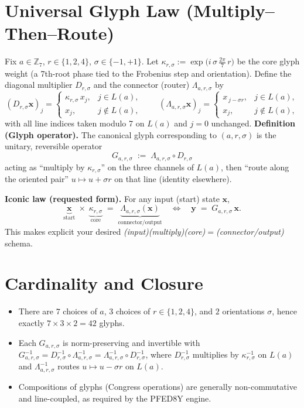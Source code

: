 \documentclass[pdflatex,sn-mathphys-num]{sn-jnl}
\theoremstyle{thmstyleone}
\theoremstyle{thmstyletwo}
\theoremstyle{thmstylethree}
\begin{document}
\section{Universal Glyph Law (Multiply–Then–Route)}\label{sec:universal-glyph-law}

Fix \(a\in\mathbb{Z}_7\), \(r\in\{1,2,4\}\), \(\sigma\in\{-1,+1\}\).
Let \(\kappa_{r,\sigma}:=\exp\!\big(i\,\sigma\,\tfrac{2\pi}{7}\,r\big)\) be the
core glyph weight (a 7th-root phase tied to the Frobenius step and orientation).
Define the diagonal multiplier \(D_{r,\sigma}\) and the connector (router)
\(\Lambda_{a,r,\sigma}\) by
\[
(D_{r,\sigma}\mathbf{x})_j =
\begin{cases}
\kappa_{r,\sigma}\,x_j, & j\in L(a),\\
x_j, & j\notin L(a),
\end{cases}
\qquad
(\Lambda_{a,r,\sigma}\mathbf{x})_j =
\begin{cases}
x_{\,j-\sigma r}, & j\in L(a),\\
x_j, & j\notin L(a),
\end{cases}
\]
with all line indices taken modulo 7 on \(L(a)\) and \(j=0\) unchanged.
\medskip
\noindent\textbf{Definition (Glyph operator).}
The canonical glyph corresponding to \((a,r,\sigma)\) is the unitary, reversible operator
\[
\boxed{\quad
G_{a,r,\sigma} \;:=\; \Lambda_{a,r,\sigma}\circ D_{r,\sigma}
\quad}
\]
acting as “multiply by \(\kappa_{r,\sigma}\)” on the three channels of \(L(a)\), then
“route along the oriented pair” \(u\mapsto u+\sigma r\) on that line (identity elsewhere).

\medskip
\noindent\textbf{Iconic law (requested form).}
For any input (start) state \(\mathbf{x}\),
\[
\underbrace{\mathbf{x}}_{\text{start}}\;\times\;
\underbrace{\kappa_{r,\sigma}}_{\text{core}}\;=\;
\underbrace{\Lambda_{a,r,\sigma}(\mathbf{x})}_{\text{connector/output}}
\quad\Longleftrightarrow\quad
\mathbf{y} \;=\; G_{a,r,\sigma}\,\mathbf{x}.
\tag{\(\star\)}
\]
This makes explicit your desired \emph{(input)(multiply)(core)\(=\)(connector/output)} schema.

\section{Cardinality and Closure}
\begin{itemize}
\item There are \(7\) choices of \(a\), \(3\) choices of \(r\in\{1,2,4\}\),
and \(2\) orientations \(\sigma\), hence exactly \(7\times3\times2=42\) glyphs.
\item Each \(G_{a,r,\sigma}\) is norm-preserving and invertible with
\(G_{a,r,\sigma}^{-1}= D_{r,\sigma}^{-1}\circ \Lambda_{a,r,\sigma}^{-1}
= \Lambda_{a,r,\sigma}^{-1}\circ D_{r,\sigma}^{-1}\),
where \(D_{r,\sigma}^{-1}\) multiplies by \(\kappa_{r,\sigma}^{-1}\) on \(L(a)\)
and \(\Lambda_{a,r,\sigma}^{-1}\) routes \(u\mapsto u-\sigma r\) on \(L(a)\).
\item Compositions of glyphs (Congress operations) are generally
non-commutative and line-coupled, as required by the PFED8Y engine.
\end{itemize}
\end{document}
